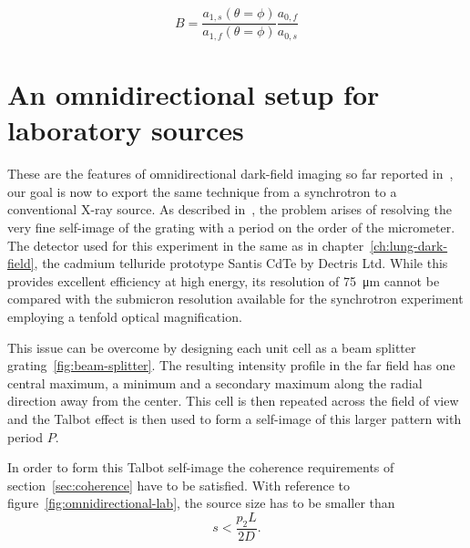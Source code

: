 \begin{equation}
    B = \frac{a_{1,s}(\theta = \phi)}{a_{1,f}(\theta =
\phi)}\frac{a_{0,f}}{a_{0,s}}
    \label{eq:dark-field-omnidirectional}
\end{equation}

\section{An omnidirectional setup for laboratory sources}
These are the features of omnidirectional dark-field imaging so far reported
in~\cite{PhysRevLett.116.093902}, our goal is now to export the same
technique from a synchrotron to a conventional X-ray source.
As described in~\cite{kagias2018omnidir}, the problem arises of resolving
the very fine self-image of the grating with a period on the order of the
micrometer. The detector used for this experiment in the same as in
chapter~\ref{ch:lung-dark-field}, the cadmium telluride prototype Santis
CdTe by Dectris Ltd. While this provides excellent efficiency at high
energy, its resolution of \SI{75}{\micro\meter} cannot be compared with the
submicron resolution available for the synchrotron experiment employing a tenfold optical magnification.

This issue can be overcome by designing each unit cell as a beam splitter
grating~\ref{fig:beam-splitter}. The resulting intensity profile in the far
field has one central maximum, a minimum and a secondary maximum along the
radial direction away from the center. This cell
is then repeated across the field of view and the Talbot effect is then used
to form a self-image of this larger pattern with period $P$.

In order to form this Talbot self-image the coherence requirements of
section~\ref{sec:coherence} have to be satisfied. With reference to
figure~\ref{fig:omnidirectional-lab}, the source size has to be
smaller than
\begin{equation}
    s < \frac{p_2L}{2D}.
    \label{eq:source.size.omnidirectional}
\end{equation}

